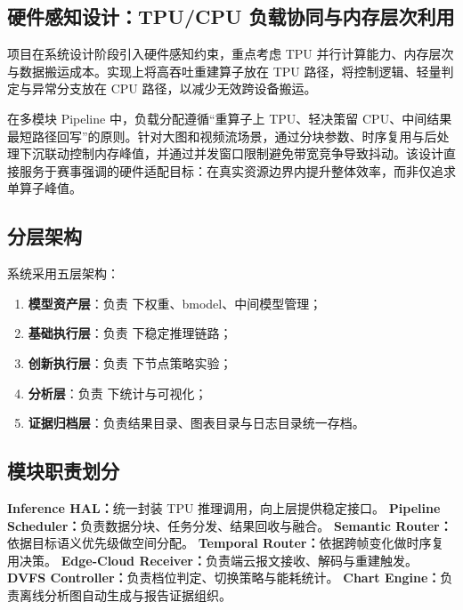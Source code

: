 \documentclass[12pt,a4paper]{ctexart}
\begin{document}
\subsection{硬件感知设计：TPU/CPU 负载协同与内存层次利用}

项目在系统设计阶段引入硬件感知约束，重点考虑 TPU 并行计算能力、内存层次与数据搬运成本。实现上将高吞吐重建算子放在 TPU 路径，将控制逻辑、轻量判定与异常分支放在 CPU 路径，以减少无效跨设备搬运。

在多模块 Pipeline 中，负载分配遵循“重算子上 TPU、轻决策留 CPU、中间结果最短路径回写”的原则。针对大图和视频流场景，通过分块参数、时序复用与后处理下沉联动控制内存峰值，并通过并发窗口限制避免带宽竞争导致抖动。该设计直接服务于赛事强调的硬件适配目标：在真实资源边界内提升整体效率，而非仅追求单算子峰值。

\subsection{分层架构}

系统采用五层架构：
\begin{enumerate}
  \item \textbf{模型资产层}：负责  下权重、bmodel、中间模型管理；
  \item \textbf{基础执行层}：负责  下稳定推理链路；
  \item \textbf{创新执行层}：负责  下节点策略实验；
  \item \textbf{分析层}：负责  下统计与可视化；
  \item \textbf{证据归档层}：负责结果目录、图表目录与日志目录统一存档。
\end{enumerate}

\subsection{模块职责划分}

\textbf{Inference HAL：}统一封装 TPU 推理调用，向上层提供稳定接口。\newline
\textbf{Pipeline Scheduler：}负责数据分块、任务分发、结果回收与融合。\newline
\textbf{Semantic Router：}依据目标语义优先级做空间分配。\newline
\textbf{Temporal Router：}依据跨帧变化做时序复用决策。\newline
\textbf{Edge-Cloud Receiver：}负责端云报文接收、解码与重建触发。\newline
\textbf{DVFS Controller：}负责档位判定、切换策略与能耗统计。\newline
\textbf{Chart Engine：}负责离线分析图自动生成与报告证据组织。
\end{document}
